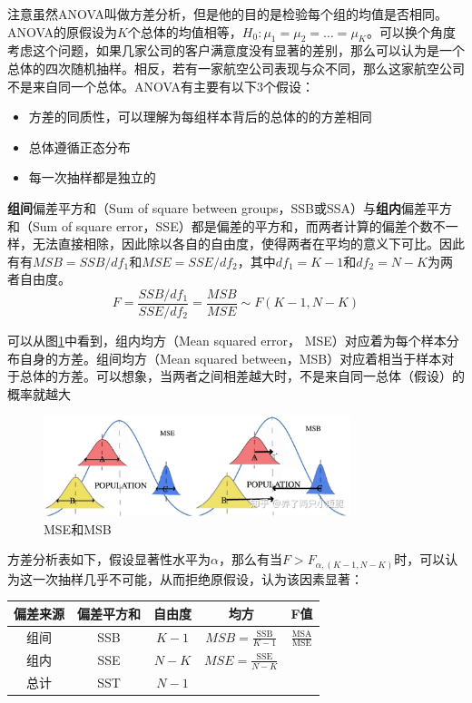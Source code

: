 \documentclass[11pt]{article}
\begin{document}
注意虽然ANOVA叫做方差分析，但是他的目的是检验每个组的均值是否相同。ANOVA的原假设为$K$个总体的均值相等，$H_0: \mu_1 = \mu_2 = \dots = \mu_K$。可以换个角度考虑这个问题，如果几家公司的客户满意度没有显著的差别，那么可以认为是一个总体的四次随机抽样。相反，若有一家航空公司表现与众不同，那么这家航空公司不是来自同一个总体。ANOVA有主要有以下3个假设：
\begin{itemize}
    \item 方差的同质性，可以理解为每组样本背后的总体的的方差相同
    \item 总体遵循正态分布
    \item 每一次抽样都是独立的
\end{itemize}

\textbf{组间}偏差平方和（Sum of square between groups，SSB或SSA）与\textbf{组内}偏差平方和（Sum of square error，SSE）都是偏差的平方和，而两者计算的偏差个数不一样，无法直接相除，因此除以各自的自由度，使得两者在平均的意义下可比。因此有有$MSB = SSB/df_1$和$MSE = SSE/df_2$，其中$df_1=K-1$和$df_2=N-K$为两者自由度。
\begin{equation*}
    F = \frac{SSB/df_1}{SSE/df_2}= \frac{MSB}{MSE} \sim F(K-1,N-K)
\end{equation*}

可以从图\ref{fig:mse-msb}中看到，组内均方（Mean squared error， MSE）对应着为每个样本分布自身的方差。组间均方（Mean squared between，MSB）对应着相当于样本对于总体的方差。可以想象，当两者之间相差越大时，不是来自同一总体（假设）的概率就越大
\begin{figure}[H]
    \centering
    \includegraphics[width=0.8\textwidth]{fig/mse-msb.jpg}
    \caption{MSE和MSB}
    \label{fig:mse-msb}
\end{figure}

方差分析表如下，假设显著性水平为$\alpha$，那么有当$F > F_{\alpha,(K-1,N-K)}$时，可以认为这一次抽样几乎不可能，从而拒绝原假设，认为该因素显著：
\begin{table}[H]
\centering
\begin{tabular}{@{}ccccc@{}}
\toprule
\textbf{偏差来源} & \textbf{偏差平方和} & \textbf{自由度} & \textbf{均方} & \textbf{F值} \\ \midrule
组间 & SSB & $K-1$ & $MSB=\frac{\text{SSB}}{K-1}$ & $\frac{\text{MSA}}{\text{MSE}}$ \\
组内 & SSE & $N-K$ & $MSE=\frac{\text{SSE}}{N-K}$ &                   \\
总计 & SST & $N-1$ &                       &                   \\ \bottomrule
\end{tabular}
\end{table}
\end{document}
